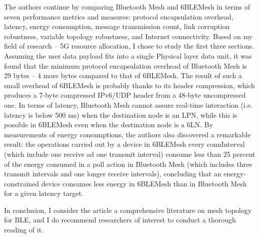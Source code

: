 \documentclass[12pt, a4paper, onside]{article}
\begin{document}
The authors continue by comparing Bluetooth Mesh and 6BLEMesh in terms of seven performance metrics and measures: protocol encapsulation overhead, latency, energy consumption, message transmission count, link corruption robustness, variable topology robustness, and Internet connectivity. Based on my field of research -- 5G resource allocation, I chose to study the first three sections. Assuming the user data payload fits into a single Physical layer data unit, it was found that the minimum protocol encapsulation overhead of Bluetooth Mesh is 29 bytes -- 4 more bytes compared to that of 6BLEMesh. The result of such a small overhead of 6BLEMesh is probably thanks to its header compression, which produces a 7-byte compressed IPv6/UDP header from a 48-byte uncompressed one. In terms of latency, Bluetooth Mesh cannot assure real-time interaction (i.e. latency is below 500 ms) when the destination node is an LPN, while this is possible in 6BLEMesh even when the destination node is a 6LN. By measurements of energy consumptions, the authors also discovered a remarkable result: the operations carried out by a device in 6BLEMesh every connInterval (which include one receive ad one transmit interval) consume less than 25 percent of the energy consumed in a poll action in Bluetooth Mesh (which includes three transmit intervals and one longer receive intervals), concluding that an energy-constrained device consumes less energy in 6BLEMesh than in Bluetooth Mesh for a given latency target.

In conclusion, I consider the article a comprehensive literature on mesh topology for BLE, and I do recommend researchers of interest to conduct a thorough reading of it.

\printbibliography
\end{document}
